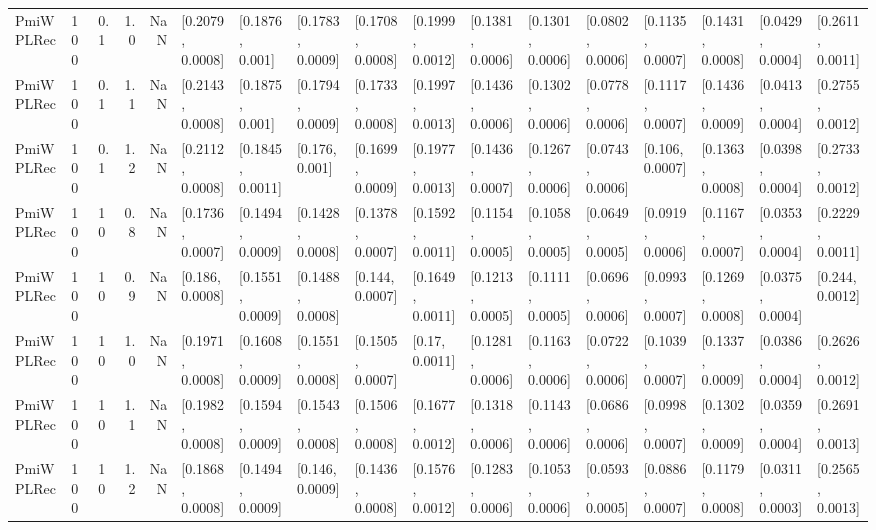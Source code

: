 \begin{tabular}{lllrrllllllllllll}
 PmiWPLRec &  100 &   0.1 &   1.0 &   NaN &  [0.2079, 0.0008] &   [0.1876, 0.001] &  [0.1783, 0.0009] &  [0.1708, 0.0008] &  [0.1999, 0.0012] &  [0.1381, 0.0006] &  [0.1301, 0.0006] &  [0.0802, 0.0006] &  [0.1135, 0.0007] &  [0.1431, 0.0008] &  [0.0429, 0.0004] &  [0.2611, 0.0011] \\
 PmiWPLRec &  100 &   0.1 &   1.1 &   NaN &  [0.2143, 0.0008] &   [0.1875, 0.001] &  [0.1794, 0.0009] &  [0.1733, 0.0008] &  [0.1997, 0.0013] &  [0.1436, 0.0006] &  [0.1302, 0.0006] &  [0.0778, 0.0006] &  [0.1117, 0.0007] &  [0.1436, 0.0009] &  [0.0413, 0.0004] &  [0.2755, 0.0012] \\
 PmiWPLRec &  100 &   0.1 &   1.2 &   NaN &  [0.2112, 0.0008] &  [0.1845, 0.0011] &    [0.176, 0.001] &  [0.1699, 0.0009] &  [0.1977, 0.0013] &  [0.1436, 0.0007] &  [0.1267, 0.0006] &  [0.0743, 0.0006] &   [0.106, 0.0007] &  [0.1363, 0.0008] &  [0.0398, 0.0004] &  [0.2733, 0.0012] \\
 PmiWPLRec &  100 &    10 &   0.8 &   NaN &  [0.1736, 0.0007] &  [0.1494, 0.0009] &  [0.1428, 0.0008] &  [0.1378, 0.0007] &  [0.1592, 0.0011] &  [0.1154, 0.0005] &  [0.1058, 0.0005] &  [0.0649, 0.0005] &  [0.0919, 0.0006] &  [0.1167, 0.0007] &  [0.0353, 0.0004] &  [0.2229, 0.0011] \\
 PmiWPLRec &  100 &    10 &   0.9 &   NaN &   [0.186, 0.0008] &  [0.1551, 0.0009] &  [0.1488, 0.0008] &   [0.144, 0.0007] &  [0.1649, 0.0011] &  [0.1213, 0.0005] &  [0.1111, 0.0005] &  [0.0696, 0.0006] &  [0.0993, 0.0007] &  [0.1269, 0.0008] &  [0.0375, 0.0004] &   [0.244, 0.0012] \\
 PmiWPLRec &  100 &    10 &   1.0 &   NaN &  [0.1971, 0.0008] &  [0.1608, 0.0009] &  [0.1551, 0.0008] &  [0.1505, 0.0007] &    [0.17, 0.0011] &  [0.1281, 0.0006] &  [0.1163, 0.0006] &  [0.0722, 0.0006] &  [0.1039, 0.0007] &  [0.1337, 0.0009] &  [0.0386, 0.0004] &  [0.2626, 0.0012] \\
 PmiWPLRec &  100 &    10 &   1.1 &   NaN &  [0.1982, 0.0008] &  [0.1594, 0.0009] &  [0.1543, 0.0008] &  [0.1506, 0.0008] &  [0.1677, 0.0012] &  [0.1318, 0.0006] &  [0.1143, 0.0006] &  [0.0686, 0.0006] &  [0.0998, 0.0007] &  [0.1302, 0.0009] &  [0.0359, 0.0004] &  [0.2691, 0.0013] \\
 PmiWPLRec &  100 &    10 &   1.2 &   NaN &  [0.1868, 0.0008] &  [0.1494, 0.0009] &   [0.146, 0.0009] &  [0.1436, 0.0008] &  [0.1576, 0.0012] &  [0.1283, 0.0006] &  [0.1053, 0.0006] &  [0.0593, 0.0005] &  [0.0886, 0.0007] &  [0.1179, 0.0008] &  [0.0311, 0.0003] &  [0.2565, 0.0013] \\

\end{tabular}

